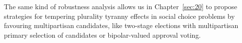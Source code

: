 The same kind of robustness analysis allows us in Chapter~\vref{sec:20} to propose strategies for tempering plurality tyranny effects in social choice problems by favouring multipartisan candidates, like two-stage elections with multipartisan primary selection of candidates or bipolar-valued approval voting.



% 
% 
